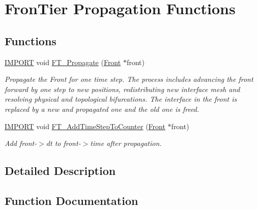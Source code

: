 \hypertarget{group___p_r_o_p_a_g_a_t_i_o_n}{}\section{Fron\+Tier Propagation Functions}
\label{group___p_r_o_p_a_g_a_t_i_o_n}
\subsection*{Functions}
\begin{DoxyCompactItemize}
\item 
\hyperlink{cdecs_8h_a773175d74e73776d69c3e538f17de1ee}{I\+M\+P\+O\+RT} void \hyperlink{group___p_r_o_p_a_g_a_t_i_o_n_ga0c7f34093dfd543ebd66b2ccff8742cd}{F\+T\+\_\+\+Propagate} (\hyperlink{fdecs_8h_ac32202b798f848095c489cfd04c4ca5f}{Front} $\ast$front)
\begin{DoxyCompactList}\small\item\em Propagate the Front for one time step. The process includes advancing the front forward by one step to new positions, redistributing new interface mesh and resolving physical and topological bifurcations. The interface in the front is replaced by a new and propagated one and the old one is freed. \end{DoxyCompactList}\item 
\hyperlink{cdecs_8h_a773175d74e73776d69c3e538f17de1ee}{I\+M\+P\+O\+RT} void \hyperlink{group___p_r_o_p_a_g_a_t_i_o_n_ga51834b9206a288347040fe15e719e295}{F\+T\+\_\+\+Add\+Time\+Step\+To\+Counter} (\hyperlink{fdecs_8h_ac32202b798f848095c489cfd04c4ca5f}{Front} $\ast$front)
\begin{DoxyCompactList}\small\item\em Add front-\/$>$dt to front-\/$>$time after propagation. \end{DoxyCompactList}\end{DoxyCompactItemize}


\subsection{Detailed Description}


\subsection{Function Documentation}
